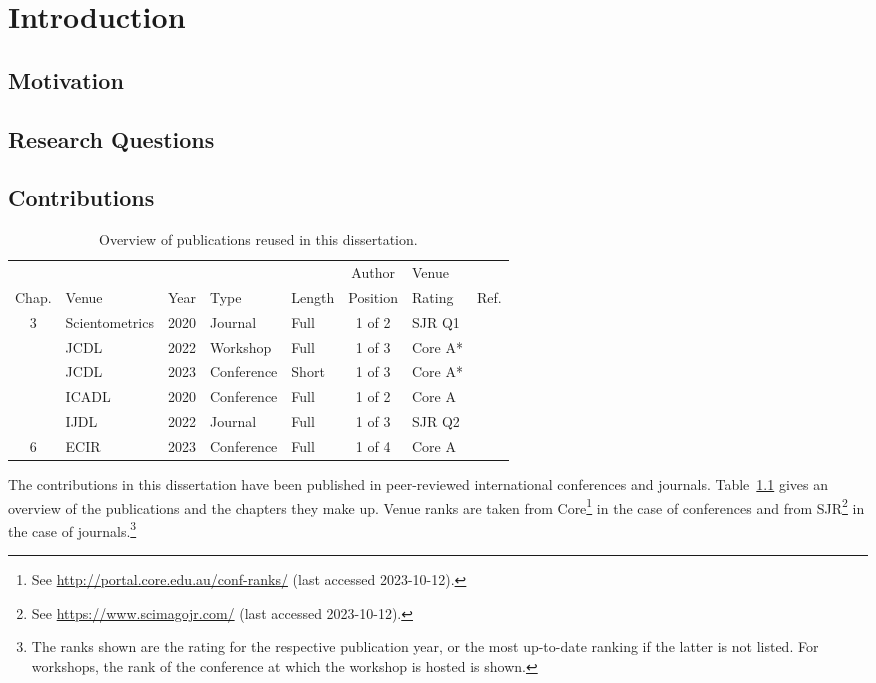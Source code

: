 \chapter{Introduction}

\section{Motivation}
\cite{burger2014diss}
\Blindtext[1]

\section{Research Questions}
\Blindtext[1]

\section{Contributions}

\begin{table}[tb]
\centering
  \caption{Overview of publications reused in this dissertation.}
  \label{tab:primarypublicationoverview}
  \begin{tabular}{cllllclr}
    \hline
    \ & \ & \ & \ & \ & Author & Venue & \ \\
    Chap. & Venue & Year & Type & Length & Position & Rating & Ref. \\
    \hline
    3 & Scientometrics & 2020 & Journal & Full & 1 of 2 & SJR Q1 & \cite{Saier2020} \\
    \arrayrulecolor{lightgrey}\cline{1-8}
    \multirow{2}{*}{4} & JCDL & 2022 & Workshop & Full & 1 of 3 & Core A* & \cite{Saier2022ULITE} \\
    \ & JCDL & 2023 & Conference & Short & 1 of 3 & Core A* & \cite{Saier2023unarXive} \\
    \arrayrulecolor{lightgrey}\cline{1-8}
    \multirow{2}{*}{5} & ICADL & 2020 & Conference & Full & 1 of 2 & Core A & \cite{Saier2020xling} \\
    \ & IJDL & 2022 & Journal & Full & 1 of 3 & SJR Q2 & \cite{Saier2021} \\
    \arrayrulecolor{lightgrey}\cline{1-8}\arrayrulecolor{black}
    6 & ECIR & 2023 & Conference & Full & 1 of 4 & Core A & \cite{Saier2023hyperpie} \\
    \hline
    \end{tabular}
\end{table}

The contributions in this dissertation have been published in peer-reviewed international conferences and journals. Table~\ref{tab:primarypublicationoverview} gives an overview of the publications and the chapters they make up. Venue ranks are taken from Core\footnote{See \url{http://portal.core.edu.au/conf-ranks/} (last accessed 2023-10-12).} in the case of conferences and from SJR\footnote{See \url{https://www.scimagojr.com/} (last accessed 2023-10-12).} in the case of journals.\footnote{The ranks shown are the rating for the respective publication year, or the most up-to-date ranking if the latter is not listed. For workshops, the rank of the conference at which the workshop is hosted is shown.}

